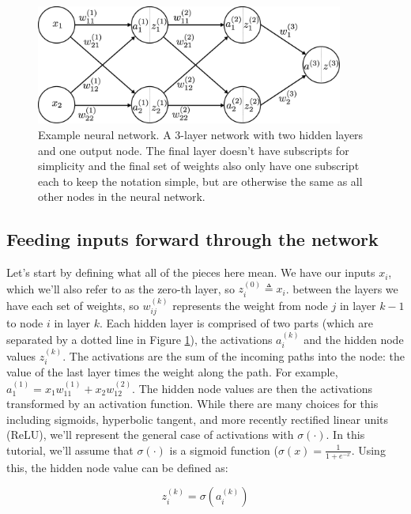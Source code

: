 \documentclass{article}
\begin{document}
\begin{figure}[h]
\centering
\includegraphics[width=0.9\textwidth]{./neural_networks.eps}
\caption{Example neural network. A 3-layer network with two hidden layers and one output node. The final layer doesn't have subscripts for simplicity and the final set of weights also only have one subscript each to keep the notation simple, but are otherwise the same as all other nodes in the neural network.}
\label{fig:nnexample}
\end{figure}

\subsection{Feeding inputs forward through the network}

Let's start by defining what all of the pieces here mean. We have our inputs $x_i$, which we'll also refer to as the zero-th layer, so $z_i^{(0)} \triangleq x_i $. between the layers we have each set of weights, so $w_{ij}^{(k)}$ represents the weight from node $j$ in layer $k-1$ to node $i$ in layer $k$. Each hidden layer is comprised of two parts (which are separated by a dotted line in Figure \ref{fig:nnexample}), the activations $a_i^{(k)}$ and the hidden node values $z_i^{(k)}$. The activations are the sum of the incoming paths into the node: the value of the last layer times the weight along the path. For example, $a_1^{(1)}=x_1 w_{11}^{(1)} + x_2 w_{12}^{(2)}$. The hidden node values are then the activations transformed by an activation function. While there are many choices for this including sigmoids, hyperbolic tangent, and more recently rectified linear units (ReLU), we'll represent the general case of activations with $\sigma(\cdot)$. In this tutorial, we'll assume that $\sigma(\cdot)$ is a sigmoid function ($\sigma(x) = \frac{1}{1+e^{-x}}$. Using this, the hidden node value can be defined as:

\begin{equation}
    z_i^{(k)} = \sigma(a_i^{(k)})
\end{equation}
\end{document}
